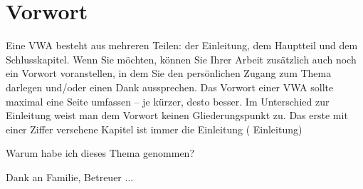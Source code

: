 \chapter*{Vorwort}
\label{cha:vorwort}
\thispagestyle{empty}
Eine VWA besteht aus mehreren Teilen: der Einleitung, dem Hauptteil und dem Schlusskapitel. Wenn Sie möchten, können Sie Ihrer Arbeit zusätzlich auch noch ein Vorwort voranstellen, in dem Sie den persönlichen Zugang zum Thema darlegen und/oder einen Dank aussprechen. Das Vorwort einer VWA sollte maximal eine Seite umfassen – je kürzer, desto besser. Im Unterschied zur Einleitung weist man dem Vorwort keinen Gliederungspunkt zu. Das erste mit einer Ziffer versehene Kapitel ist immer die Einleitung ( Einleitung\grqq)

Warum habe ich dieses Thema genommen?

Dank an Familie, Betreuer ...